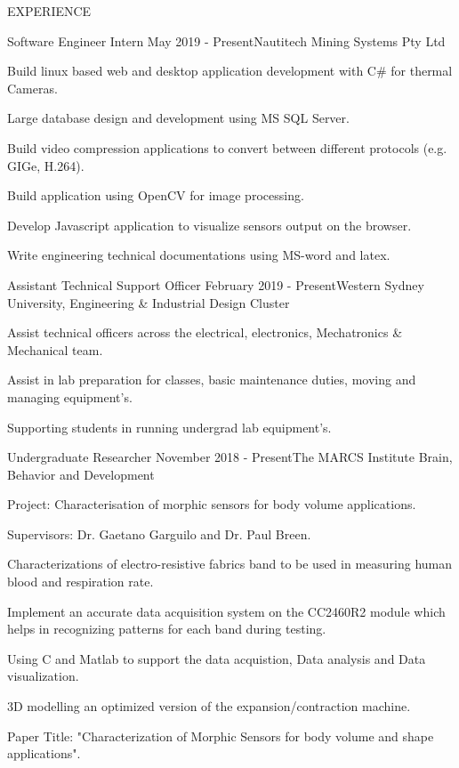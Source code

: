 \documentclass{resume} %
\begin{document}
\begin{rSection}{EXPERIENCE}

\begin{rSubsection}{Software Engineer Intern} {May 2019 - Present}{\faInstitution Nautitech Mining Systems Pty Ltd}{}
\item Build linux based web and desktop application development with C\# for thermal Cameras.
\item Large database design and development using MS SQL Server.
\item Build video compression applications to convert between different protocols (e.g. GIGe, H.264).
\item Build application using OpenCV for image processing.
\item Develop Javascript application to visualize sensors output on the browser.
\item Write engineering technical documentations using MS-word and latex.

\end{rSubsection}

\begin{rSubsection}{Assistant Technical Support Officer} {February 2019 - Present}{\faInstitution Western Sydney University, Engineering \& Industrial Design Cluster}{}
\item Assist technical officers across the electrical, electronics, Mechatronics \& Mechanical team.
\item Assist in lab preparation for classes, basic maintenance duties, moving and managing equipment's.
\item Supporting students in running undergrad lab equipment's.
\end{rSubsection}

\begin{rSubsection}{Undergraduate Researcher} {November 2018 - Present}{\faInstitution The MARCS Institute Brain, Behavior and Development}{}
\item Project: Characterisation of morphic sensors for body volume applications.
\item Supervisors: Dr. Gaetano Garguilo and Dr. Paul Breen.
\item Characterizations of electro-resistive fabrics band to be used in measuring human blood and respiration rate.
\item Implement an accurate data acquisition system on the CC2460R2 module which helps in recognizing patterns for each band during testing. 
\item Using C and Matlab to support the data acquistion, Data analysis and Data visualization.
\item 3D modelling an optimized version of the expansion/contraction machine.
\item Paper Title: "Characterization of Morphic Sensors for body volume and shape applications".
\end{rSubsection}


\end{rSection}
\end{document}
